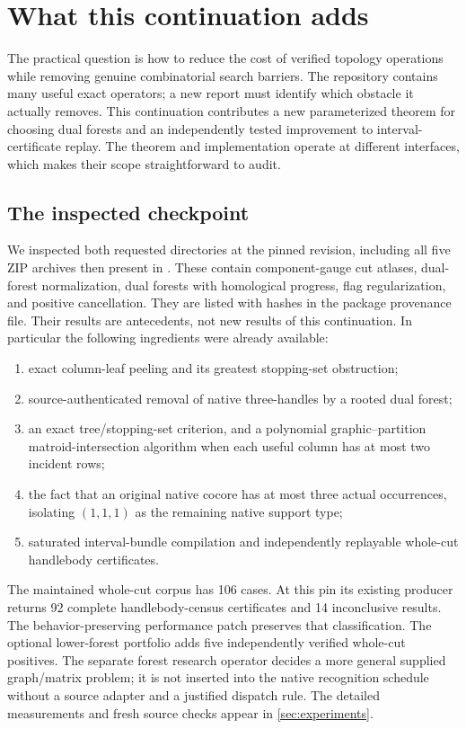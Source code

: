 \section{What this continuation adds}
\label{sec:scope}

The practical question is how to reduce the cost of verified topology
operations while removing genuine combinatorial search barriers.  The
repository contains many useful exact operators; a new report must identify
which obstacle it actually removes.  This continuation contributes a new
parameterized theorem for choosing dual forests and an independently tested
improvement to interval-certificate replay.  The theorem and implementation
operate at different interfaces, which makes their scope straightforward to
audit.

\subsection{The inspected checkpoint}

We inspected both requested directories at the pinned revision, including
all five ZIP archives then present in .  These contain
component-gauge cut atlases, dual-forest normalization, dual forests with
homological progress, flag regularization, and positive cancellation.
They are listed with hashes in the package provenance file.  Their results
are antecedents, not new results of this continuation.  In particular the
following ingredients were already available:

\begin{enumerate}
\item exact column-leaf peeling and its greatest stopping-set obstruction;
\item source-authenticated removal of native three-handles by a rooted
  dual forest;
\item an exact tree/stopping-set criterion, and a polynomial
  graphic--partition matroid-intersection algorithm when each useful
  column has at most two incident rows;
\item the fact that an original native cocore has at most three actual
  occurrences, isolating $(1,1,1)$ as the remaining native support type;
\item saturated interval-bundle compilation and independently replayable
  whole-cut handlebody certificates.
\end{enumerate}

The maintained whole-cut corpus has 106 cases.  At this pin its existing
producer returns 92 complete handlebody-census certificates and 14
inconclusive results.  The behavior-preserving performance patch preserves
that classification.  The optional lower-forest portfolio adds five
independently verified whole-cut positives.  The separate forest research
operator decides a more
general supplied graph/matrix problem; it is not inserted into the native
recognition schedule without a source adapter and a justified dispatch rule.
The detailed measurements and fresh source checks appear in
\cref{sec:experiments}.

